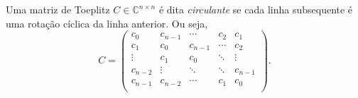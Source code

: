 \begin{definition*}
  Uma matriz de Toeplitz $ C \in \mathbb{C}^{n \times n} $ é dita \textit{circulante} se cada linha subsequente é uma rotação cíclica da linha anterior. Ou seja,
  \[
    C = \begin{pmatrix}
      c_0     & c_{n-1} & \cdots  & c_2    & c_1     \\
      c_1     & c_0     & c_{n-1} & \cdots & c_2     \\
      \vdots  & c_1     & c_0     & \ddots & \vdots  \\
      c_{n-2} & \vdots  & \ddots  & \ddots & c_{n-1} \\
      c_{n-1} & c_{n-2} & \cdots  & c_1    & c_0     \\
    \end{pmatrix}.
  \]
\end{definition*}

